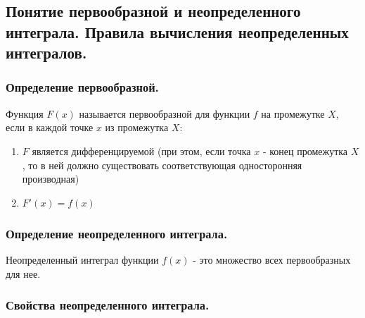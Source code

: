 \documentclass[a4paper,12pt]{article}
\theoremstyle{plain} %
\theoremstyle{definition} %
\theoremstyle{remark} %
\begin{document}
\subsection*{Понятие первообразной и неопределенного интеграла. Правила вычисления неопределенных интегралов.}

\subsubsection*{Определение первообразной.}
Функция $F(x)$ называется первообразной для функции $f$ на промежутке $X$, если в каждой точке $x$ из промежутка $X$:
\begin{enumerate}
	\item $F$ является дифференцируемой (при этом, если точка $x$ - конец промежутка $X$, то в ней должно существовать соответствующая односторонняя производная)
	\item $F'(x) = f(x)$
\end{enumerate}

\subsubsection*{Определение неопределенного интеграла.}
Неопределенный интеграл функции $f(x)$ - это множество всех первообразных для нее.

\subsubsection*{Свойства неопределенного интеграла.}
\end{document}
